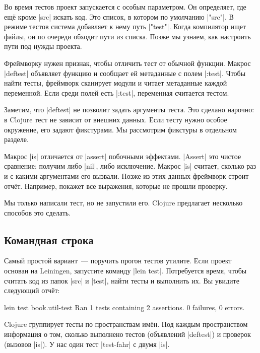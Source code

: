 Во время тестов проект запускается с особым параметром. Он определяет, где ещ\"{е}
кроме \spverb|src| искать код. Это список, в котором по умолчанию
\spverb|"src"|. В режиме тестов система добавляет к нему путь
\spverb|"test"|. Когда компилятор ищет файлы, он по очереди обходит пути из
списка. Позже мы узнаем, как настроить пути под нужды проекта.


Фреймворку нужен признак, чтобы отличить тест от обычной функции. Макрос
\spverb|deftest| объявляет функцию и сообщает ей метаданные с полем
\spverb|:test|. Чтобы найти тесты, фреймворк сканирует модули и читает
метаданные каждой переменной. Если среди полей есть \spverb|:test|, переменная
считается тестом.

Заметим, что \spverb|deftest| не позволит задать аргументы теста. Это сделано
нарочно: в Clojure тест не зависит от внешних данных. Если тесту нужно особое
окружение, его задают фикстурами. Мы рассмотрим фикстуры в отдельном разделе.

Макрос \spverb|is| отличается от \spverb|assert| побочными
эффектами. \spverb|Assert| это чистое сравнение: получим либо \spverb|nil|, либо
исключение. Макрос \spverb|is| считает, сколько раз и с какими аргументами его
вызвали. Позже из этих данных фреймворк строит отч\"{е}т. Например, покажет все
выражения, которые не прошли проверку.

Мы только написали тест, но не запустили его. Clojure предлагает несколько
способов это сделать.

\subsection{Командная строка}


Самый простой вариант~--- поручить прогон тестов утилите. Если проект основан на
Leiningen, запустите команду \spverb|lein test|.
Потребуется время, чтобы считать код из папок \spverb|src| и \spverb|test|,
найти тесты и выполнить их. Вы увидите следующий отч\"{е}т:

\begin{english}
  \begin{text}
lein test book.util-test
Ran 1 tests containing 2 assertions.
0 failures, 0 errors.
  \end{text}
\end{english}

Clojure группирует тесты по пространствам им\"{е}н. Под каждым пространством
информация о том, сколько выполнено тестов (объявлений \spverb|deftest|) и
проверок (вызовов \spverb|is|). У нас один тест \spverb|test-fahr| с двумя
\spverb|is|.

